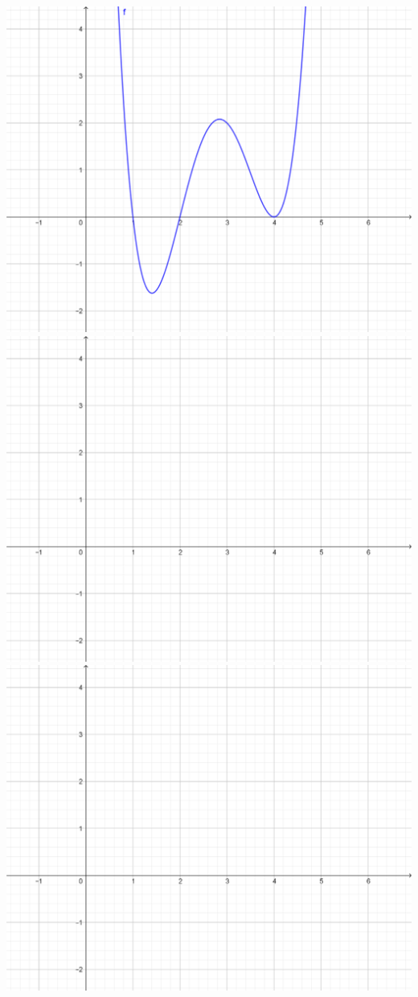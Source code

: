 \documentclass[oneside,openany,headings=optiontotoc,11pt,numbers=noenddot]{scrreprt}
\begin{document}
	\pagestyle{empty}
	\begin{landscape}
		\centering
		\includegraphics[scale=0.9]{Bilder/UB_fkt.png}\\
		\includegraphics[scale=0.9]{Bilder/UB_Koord.png}\\
		\includegraphics[scale=0.9]{Bilder/UB_Koord.png}
	\end{landscape}
\end{document}
